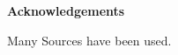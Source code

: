 \thispagestyle{empty}
        \begin{flushleft}
                \fontsize{5cm}{1em}\textbf{Acknowledgements} 
                
        \end{flushleft}
        \vspace{2.5cm}
                        Many Sources have been used.
\null